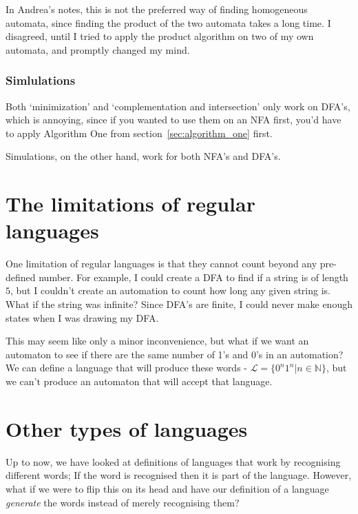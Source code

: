 In Andrea's notes, this is not the preferred way of finding homogeneous
automata, since finding the product of the two automata takes a long time. I
disagreed, until I tried to apply the product algorithm on two of my own
automata, and promptly changed my mind.

\subsubsection{Simlulations}

Both `minimization' and `complementation and intersection' only work on DFA's,
which is annoying, since if you wanted to use them on an NFA first, you'd have
to apply Algorithm One from section~\ref{sec:algorithm_one} first.

Simulations, on the other hand, work for both NFA's and DFA's.


\section{The limitations of regular languages}

One limitation of regular languages is that they cannot count beyond any
pre-defined number. For example, I could create a DFA to find if a string is of
length $5$, but I couldn't create an automation to count how long any given
string is. What if the string was infinite? Since DFA's are finite, I could
never make enough states when I was drawing my DFA.

This may seem like only a minor inconvenience, but what if we want an automaton
to see if there are the same number of 1's and 0's in an automation? We can
define a language that will produce these words - $\mathcal{L} = \{0^n1^n|n \in
\mathbb{N}\}$, but we can't produce an automaton that will accept that language.

\section{Other types of languages}
\label{sec:other_languages}

Up to now, we have looked at definitions of languages that work by recognising
different words; If the word is recognised then it is part of the language.
However, what if we were to flip this on its head and have our definition of a
language {\it generate} the words instead of merely recognising them?


